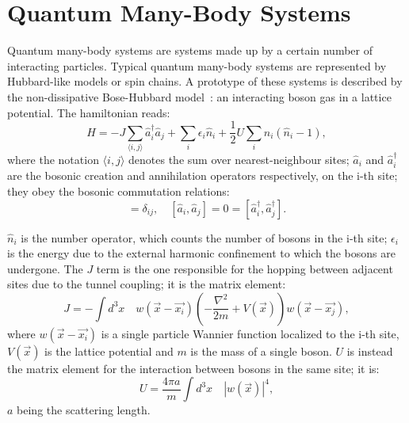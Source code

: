 
\section{Quantum Many-Body Systems}
\label{hubb_model}
Quantum many-body systems are systems made up by a certain number of interacting particles. Typical quantum many-body systems are represented by Hubbard-like models or spin chains. 
A prototype of these systems is described by the non-dissipative Bose-Hubbard model~\cite{Greiner_bose_hubbard}: an interacting boson gas in a lattice potential. The hamiltonian reads:
\begin{equation}
    H = -J\sum_{\langle i,j \rangle} \hat{a}^{\dagger}_i \hat{a}_j + \sum_i \epsilon_i \hat{n}_i+ \frac{1}{2} U \sum_i \hat{n}_i(\hat{n}_i -1 ),
\end{equation}
where the notation $\langle i, j \rangle$ denotes the sum over nearest-neighbour sites; $\hat{a}_i$ and $\hat{a}^{\dagger}_i$ are the bosonic creation and annihilation operators respectively, on the i-th site; they obey the bosonic commutation relations:
\begin{equation*}
    [\hat{a}_i, \hat{a}_j^\dagger] = \delta_{ij}, \quad [\hat{a}_i, \hat{a}_j] = 0 = [\hat{a}_i^\dagger, \hat{a}_j^\dagger].
\end{equation*}

$\hat{n}_i$ is the number operator, which counts the number of bosons in the i-th site; $\epsilon_i$ is the energy due to the external harmonic confinement to which the bosons are undergone. The $J$ term is the one responsible for the hopping between adjacent sites due to the tunnel coupling; it is the matrix element:
\begin{equation*}
    J = -\int d^3x \quad w(\Vec{x}-\Vec{x_i})(-\frac{\nabla^2}{2m}+V(\Vec{x}))w(\Vec{x}-\Vec{x_j}),
\end{equation*}
where $w(\Vec{x}-\Vec{x_i})$ is a single particle Wannier function localized to the i-th site, $V(\Vec{x})$ is the lattice potential and $m$ is the mass of a single boson.
$U$ is instead the matrix element for the interaction between bosons in the same site; it is:
\begin{equation*}
    U = \frac{4\pi a}{m} \int d^3x \quad |w(\Vec{x})|^4, 
\end{equation*}
$a$ being the scattering length. 

